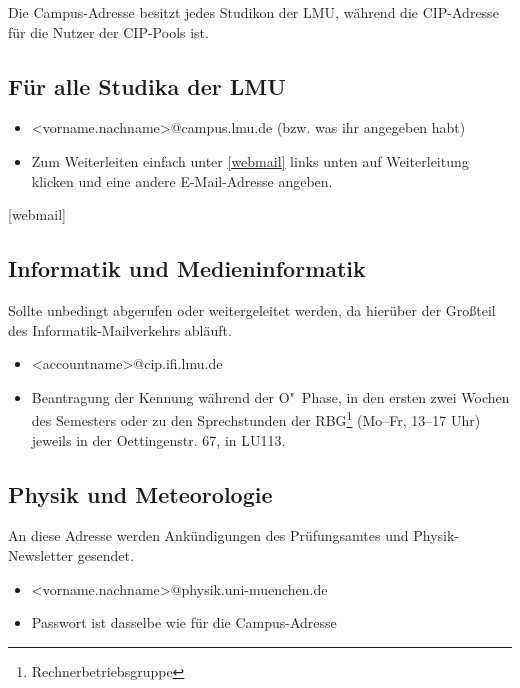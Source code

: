Die Campus-Adresse besitzt jedes Studikon der LMU, während die CIP-Adresse für die Nutzer der CIP-Pools ist.

\subsection*{Für alle Studika der LMU}
\begin{itemize}
	\item <vorname.nachname>@campus.lmu.de (bzw. was ihr angegeben habt)
	\item Zum Weiterleiten einfach unter \ref{webmail} links unten auf Weiterleitung klicken und eine andere E-Mail-Adresse angeben.
\end{itemize}
\begin{urlList}
	[webmail]
\end{urlList}

\subsection*{Informatik und Medieninformatik \subjectList{\subjectI\subjectMI}}
Sollte unbedingt abgerufen oder weitergeleitet werden, da hierüber der Großteil des Informatik-Mailverkehrs abläuft. 
\begin{itemize}
	\item <accountname>@cip.ifi.lmu.de
	\item Beantragung der Kennung während der O"~Phase, in den ersten zwei Wochen des Semesters oder zu den Sprechstunden der RBG\footnote{Rechnerbetriebsgruppe} 
		(Mo--Fr, 13--17 Uhr) jeweils in der Oettingenstr. 67, in LU113.
\end{itemize}
\begin{urlList}
\end{urlList}

\subsection*{Physik und Meteorologie\subjectList{\subjectP}}
An diese Adresse werden Ankündigungen des Prüfungsamtes und
Physik-Newsletter gesendet.
\begin{itemize}
	\item <vorname.nachname>@physik.uni-muenchen.de
	\item Passwort ist dasselbe wie für die Campus-Adresse
\end{itemize}
\begin{urlList}
\end{urlList}

